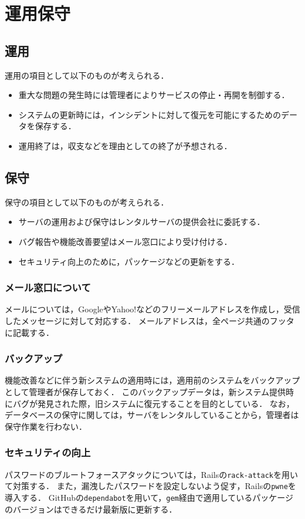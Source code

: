 \chapter{運用保守}
\section{運用}
運用の項目として以下のものが考えられる．
\begin{itemize}
	\item 重大な問題の発生時には管理者によりサービスの停止・再開を制御する．
	\item システムの更新時には，インシデントに対して復元を可能にするためのデータを保存する．
	\item 運用終了は，収支などを理由としての終了が予想される．
\end{itemize}
\section{保守}
保守の項目として以下のものが考えられる．
\begin{itemize}
	\item サーバの運用および保守はレンタルサーバの提供会社に委託する．
	\item バグ報告や機能改善要望はメール窓口により受け付ける．
	\item セキュリティ向上のために，パッケージなどの更新をする．
\end{itemize}
\subsection{メール窓口について}
メールについては，GoogleやYahoo!などのフリーメールアドレスを作成し，受信したメッセージに対して対応する．
メールアドレスは，全ページ共通のフッタに記載する．
\subsection{バックアップ}
機能改善などに伴う新システムの適用時には，適用前のシステムをバックアップとして管理者が保存しておく．
このバックアップデータは，新システム提供時にバグが発見された際，旧システムに復元することを目的としている．
なお，データベースの保守に関しては，サーバをレンタルしていることから，管理者は保守作業を行わない．
\subsection{セキュリティの向上}
パスワードのブルートフォースアタックについては，Railsの\texttt{rack-attack}を用いて対策する．
また，漏洩したパスワードを設定しないよう促す，Railsの\texttt{pwne}を導入する．
GitHubの\texttt{dependabot}を用いて，\texttt{gem}経由で適用しているパッケージのバージョンはできるだけ最新版に更新する．